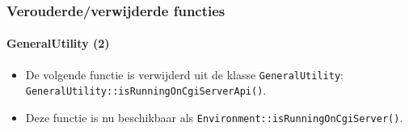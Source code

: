 
\begin{frame}[fragile]
	\frametitle{Verouderde/verwijderde functies}
	\framesubtitle{GeneralUtility (2)}

	\begin{itemize}
		\item De volgende functie is verwijderd uit de klasse \texttt{GeneralUtility}:
			\texttt{GeneralUtility::isRunningOnCgiServerApi()}.
		\item Deze functie is nu beschikbaar als\newline
			\texttt{Environment::isRunningOnCgiServer()}.

	\end{itemize}

\end{frame}


